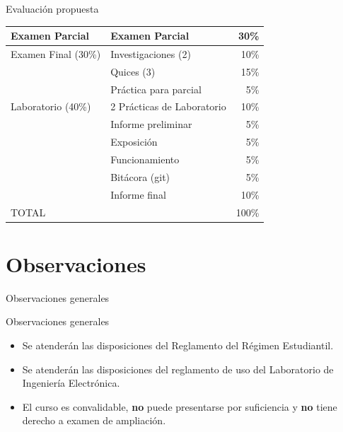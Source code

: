 \documentclass[xcolor=dvipsnames]{beamer}
\newcommand{\pageframe}[1]{\frame{\begin{center}{ \Huge #1 }\end{center}}}
\begin{document}
\begin{frame}{Evaluación propuesta}
\begin{center}
\begin{tabular}{|l|l|r|}\hline
	Examen Parcial		& Examen Parcial	& 	30\%\\\hline
	Examen Final (30\%)	& Investigaciones (2)	&	10\%\\\cline{2-3}
				& Quices (3)		&	15\%\\\cline{2-3}
				& Práctica para parcial &	 5\%\\\hline
	Laboratorio (40\%)	& 2 Prácticas de Laboratorio	&	 10\%\\\cline{2-3}
				& Informe preliminar	&	 5\%\\\cline{2-3}
				& Exposición	&	5\%\\\cline{2-3}
				& Funcionamiento	&	5\%\\\cline{2-3}
				& Bitácora (git)	&	 5\%\\\cline{2-3}
				& Informe final		&	10\%\\\hline\hline
	\multicolumn{2}{|l|}{TOTAL}			&	100\%\\\hline
\end{tabular}
\end{center}
\end{frame}
\section{Observaciones}

\pageframe{Observaciones}

\begin{frame}{Observaciones generales}
  \begin{block}{Observaciones generales}
    \begin{itemize}[<+->]
      \item Se atenderán las disposiciones del Reglamento del Régimen Estudiantil.
      \item Se atenderán las disposiciones del reglamento de uso del Laboratorio de Ingeniería Electrónica.
      \item El curso es convalidable, \textbf{no} puede presentarse por suficiencia y \textbf{no} tiene derecho a examen de ampliación.
    \end{itemize}
  \end{block}
\end{frame}
\end{document}
